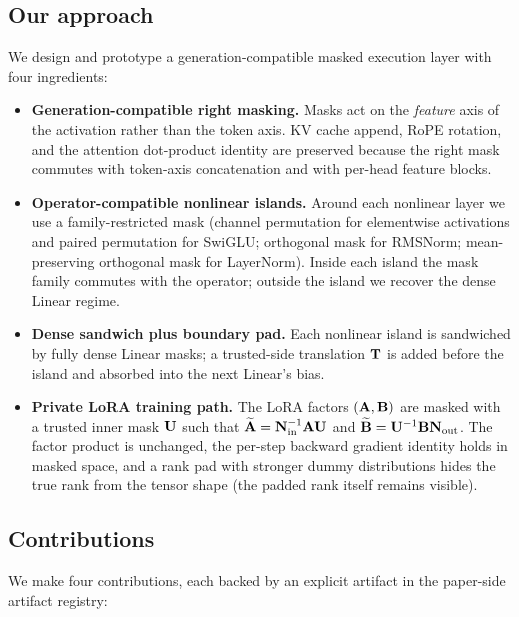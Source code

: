 \subsection{Our approach}
We design and prototype a generation-compatible masked execution layer with four ingredients:

\begin{itemize}[leftmargin=*, nosep]
  \item \textbf{Generation-compatible right masking.} Masks act on the \emph{feature} axis of the activation rather than the token axis. KV cache append, RoPE rotation, and the attention dot-product identity are preserved because the right mask commutes with token-axis concatenation and with per-head feature blocks.
  \item \textbf{Operator-compatible nonlinear islands.} Around each nonlinear layer we use a family-restricted mask (channel permutation for elementwise activations and paired permutation for SwiGLU; orthogonal mask for RMSNorm; mean-preserving orthogonal mask for LayerNorm). Inside each island the mask family commutes with the operator; outside the island we recover the dense Linear regime.
  \item \textbf{Dense sandwich plus boundary pad.} Each nonlinear island is sandwiched by fully dense Linear masks; a trusted-side translation $\mathbf{T}$ is added before the island and absorbed into the next Linear's bias.
  \item \textbf{Private LoRA training path.} The LoRA factors $(\mathbf{A}, \mathbf{B})$ are masked with a trusted inner mask $\mathbf{U}$ such that $\widetilde{\mathbf{A}} = \mathbf{N}_{\mathrm{in}}^{-1} \mathbf{A} \mathbf{U}$ and $\widetilde{\mathbf{B}} = \mathbf{U}^{-1} \mathbf{B} \mathbf{N}_{\mathrm{out}}$. The factor product is unchanged, the per-step backward gradient identity holds in masked space, and a rank pad with stronger dummy distributions hides the true rank from the tensor shape (the padded rank itself remains visible).
\end{itemize}

\subsection{Contributions}
We make four contributions, each backed by an explicit artifact in the paper-side artifact registry:

